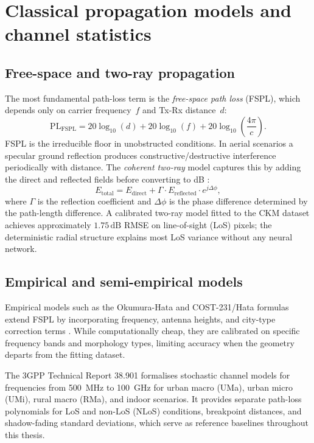 \section{Classical propagation models and channel statistics}
\label{sec:soa_classical}

\subsection{Free-space and two-ray propagation}

The most fundamental path-loss term is the \emph{free-space path loss} (FSPL),
which depends only on carrier frequency~$f$ and Tx-Rx distance~$d$:
\begin{equation}
  \mathrm{PL}_{\mathrm{FSPL}} = 20\log_{10}(d) + 20\log_{10}(f)
    + 20\log_{10}\!\left(\frac{4\pi}{c}\right).
\end{equation}
FSPL is the irreducible floor in unobstructed conditions.  In aerial scenarios a
specular ground reflection produces constructive/destructive interference
periodically with distance.  The \emph{coherent two-ray} model captures this by
adding the direct and reflected fields before converting to dB
\cite{rappaport,wocc2021}:
\begin{equation}
  E_{\mathrm{total}} = E_{\mathrm{direct}}
    + \Gamma \cdot E_{\mathrm{reflected}} \cdot e^{j\Delta\phi},
\end{equation}
where $\Gamma$ is the reflection coefficient and $\Delta\phi$ is the phase
difference determined by the path-length difference.  A calibrated two-ray model
fitted to the CKM dataset achieves approximately
$1.75\,\mathrm{dB}$ RMSE on line-of-sight (LoS) pixels; the deterministic
radial structure explains most LoS variance without any neural network.

\subsection{Empirical and semi-empirical models}

Empirical models such as the Okumura-Hata and COST-231/Hata formulas extend
FSPL by incorporating frequency, antenna heights, and city-type correction terms
\cite{rappaport,cost231}.  While computationally cheap, they are calibrated on specific
frequency bands and morphology types, limiting accuracy when the geometry
departs from the fitting dataset.

The 3GPP Technical Report 38.901 \cite{tr38901} formalises stochastic channel
models for frequencies from 500~MHz to 100~GHz for urban macro (UMa), urban
micro (UMi), rural macro (RMa), and indoor scenarios.  It provides separate
path-loss polynomials for LoS and non-LoS (NLoS) conditions, breakpoint
distances, and shadow-fading standard deviations, which serve as reference
baselines throughout this thesis.

